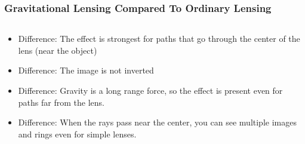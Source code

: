 \documentclass{beamer}
\begin{document}
\frame
{

    \frametitle{Gravitational Lensing Compared To Ordinary Lensing}


    \begin{columns}
        \begin{column}{0.5\textwidth}
            \begin{itemize}

                \item Difference:  The effect is strongest for paths that go
                    through the center of the lens (near the object)

                \item Difference: The image is not inverted

                \item Difference: Gravity is a long range force, so the effect
                    is present even for paths far from the lens.

                \item Difference: When the rays pass near the center,
                    you can see multiple images and rings even for simple lenses.


\end{itemize}
\end{column}
\end{columns}}
\end{document}
